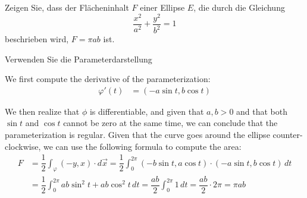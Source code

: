 \begin{ejercicio}
Zeigen Sie, dass der Flächeninhalt $F$ einer Ellipse $E$, die durch die Gleichung
\[\frac{x^2}{a^2} + \frac{y^2}{b^2} = 1\]
beschrieben wird, $F = \pi a b$ ist.
\begin{observacion}
Verwenden Sie die Parameterdarstellung
\end{observacion}

    We first compute the derivative of the parameterization:
    \begin{align*}
        \varphi'(t) &= (-a \sin t, b \cos t)
    \end{align*}

    We then realize that $\phi$ is differentiable, and given that $a,b > 0$ and that both $\sin t$ and $\cos t$ cannot be zero at the same time, we can conclude that the parameterization is regular. Given that the curve goes around the ellipse counter-clockwise, we can use the following formula to compute the area:
    \begin{align*}
        F &= \dfrac{1}{2} \int_\varphi (-y,x)\cdot d\vec{x}
        = \dfrac{1}{2} \int_0^{2\pi} (-b \sin t, a \cos t) \cdot ( -a \sin t, b \cos t) \, dt \\
        &= \dfrac{1}{2} \int_0^{2\pi} ab \sin^2 t + ab \cos^2 t \, dt
        = \dfrac{ab}{2} \int_0^{2\pi} 1 \, dt
        = \dfrac{ab}{2} \cdot 2\pi
        = \pi ab
    \end{align*}
\end{ejercicio}